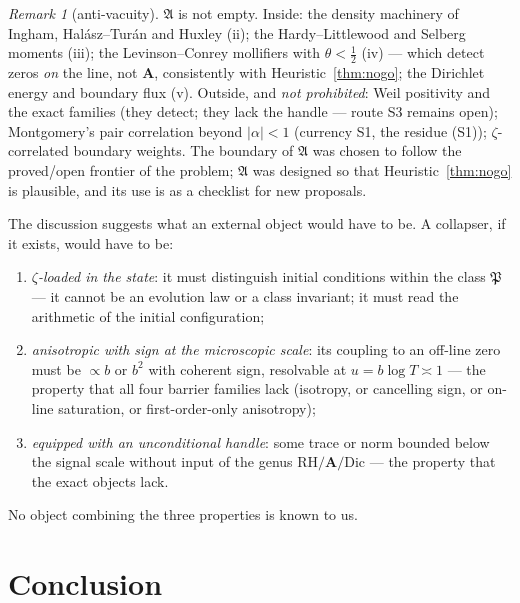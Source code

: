 \documentclass[11pt]{amsart}
\theoremstyle{plain}
\theoremstyle{definition}
\theoremstyle{remark}
\newtheorem{remark}[theorem]{Remark}
\newcommand{\RH}{\mathrm{RH}}
\newcommand{\Dic}{\mathrm{Dic}}
\newcommand{\Aax}{\mathbf{A}}
\begin{document}
\begin{remark}[anti-vacuity]\label{rem:antivacuity}
$\mathfrak A$ is not empty. Inside: the density machinery of Ingham, Hal\'asz--Tur\'an and Huxley \textup{(ii)}; the Hardy--Littlewood and Selberg moments \textup{(iii)}; the Levinson--Conrey mollifiers with $\theta<\tfrac12$ \textup{(iv)} --- which detect zeros \emph{on} the line, not $\Aax$, consistently with Heuristic~\ref{thm:nogo}; the Dirichlet energy and boundary flux \textup{(v)}. Outside, and \emph{not prohibited}: Weil positivity and the exact families (they detect; they lack the handle --- route S3 remains open); Montgomery's pair correlation beyond $|\alpha|<1$ (currency S1, the residue (S1)); $\zeta$-correlated boundary weights. The boundary of $\mathfrak A$ was chosen to follow the proved/open frontier of the problem; $\mathfrak A$ was designed so that Heuristic~\ref{thm:nogo} is plausible, and its use is as a checklist for new proposals.
\end{remark}

The discussion suggests what an external object would have to be. A collapser, if it exists, would have to be:

\begin{enumerate}
\item \emph{$\zeta$-loaded in the state}: it must distinguish initial conditions within the class $\mathfrak P$ --- it cannot be an evolution law or a class invariant; it must read the arithmetic of the initial configuration;
\item \emph{anisotropic with sign at the microscopic scale}: its coupling to an off-line zero must be $\propto b$ or $b^2$ with coherent sign, resolvable at $u=b\log T\asymp1$ --- the property that all four barrier families lack (isotropy, or cancelling sign, or on-line saturation, or first-order-only anisotropy);
\item \emph{equipped with an unconditional handle}: some trace or norm bounded below the signal scale without input of the genus $\RH/\Aax/\Dic$ --- the property that the exact objects lack.
\end{enumerate}

No object combining the three properties is known to us.

\section{Conclusion}\label{sec:conclusion}
\end{document}
